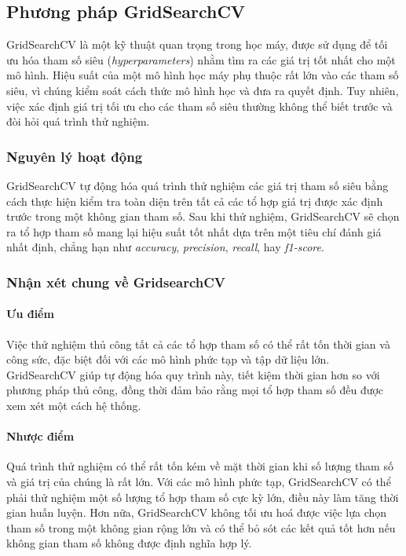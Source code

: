 \documentclass[a4paper,12pt]{article}
\begin{document}
\subsection{Phương pháp GridSearchCV}

\hspace{5mm}GridSearchCV là một kỹ thuật quan trọng trong học máy, được sử dụng để tối ưu hóa tham số siêu (\textit{hyperparameters}) nhằm tìm ra các giá trị tốt nhất cho một mô hình. Hiệu suất của một mô hình học máy phụ thuộc rất lớn vào các tham số siêu, vì chúng kiểm soát cách thức mô hình học và đưa ra quyết định. Tuy nhiên, việc xác định giá trị tối ưu cho các tham số siêu thường không thể biết trước và đòi hỏi quá trình thử nghiệm.

\subsubsection{Nguyên lý hoạt động} 
\hspace{5mm}GridSearchCV tự động hóa quá trình thử nghiệm các giá trị tham số siêu bằng cách thực hiện kiểm tra toàn diện trên tất cả các tổ hợp giá trị được xác định trước trong một không gian tham số. Sau khi thử nghiệm, GridSearchCV sẽ chọn ra tổ hợp tham số mang lại hiệu suất tốt nhất dựa trên một tiêu chí đánh giá nhất định, chẳng hạn như \textit{accuracy}, \textit{precision}, \textit{recall}, hay \textit{f1-score}.

\subsubsection{Nhận xét chung về GridsearchCV}

\paragraph{Ưu điểm}
\hspace{5mm}Việc thử nghiệm thủ công tất cả các tổ hợp tham số có thể rất tốn thời gian và công sức, đặc biệt đối với các mô hình phức tạp và tập dữ liệu lớn. GridSearchCV giúp tự động hóa quy trình này, tiết kiệm thời gian hơn so với phương pháp thủ công, đồng thời đảm bảo rằng mọi tổ hợp tham số đều được xem xét một cách hệ thống.

\paragraph{Nhược điểm}
\hspace{5mm}Quá trình thử nghiệm có thể rất tốn kém về mặt thời gian khi số lượng tham số và giá trị của chúng là rất lớn. Với các mô hình phức tạp, GridSearchCV có thể phải thử nghiệm một số lượng tổ hợp tham số cực kỳ lớn, điều này làm tăng thời gian huấn luyện. Hơn nữa, GridSearchCV không tối ưu hoá được việc lựa chọn tham số trong một không gian rộng lớn và có thể bỏ sót các kết quả tốt hơn nếu không gian tham số không được định nghĩa hợp lý.
\end{document}
